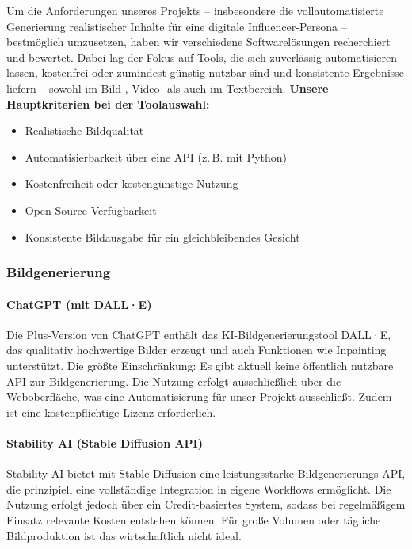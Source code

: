 \documentclass[a4paper,12pt]{article}
\begin{document}
Um die Anforderungen unseres Projekts – insbesondere die vollautomatisierte Generierung realistischer Inhalte für eine digitale Influencer-Persona – bestmöglich umzusetzen, haben wir verschiedene Softwarelösungen recherchiert und bewertet. Dabei lag der Fokus auf Tools, die sich zuverlässig automatisieren lassen, kostenfrei oder zumindest günstig nutzbar sind und konsistente Ergebnisse liefern – sowohl im Bild-, Video- als auch im Textbereich.
\clearpage
\textbf{Unsere Hauptkriterien bei der Toolauswahl:}
\begin{itemize}
    \item Realistische Bildqualität
    \item Automatisierbarkeit über eine API (z.\,B. mit Python)
    \item Kostenfreiheit oder kostengünstige Nutzung
    \item Open-Source-Verfügbarkeit
    \item Konsistente Bildausgabe für ein gleichbleibendes Gesicht
\end{itemize}

\subsubsection{Bildgenerierung}

\paragraph{ChatGPT (mit DALL·E)}
Die Plus-Version von ChatGPT enthält das KI-Bildgenerierungstool DALL·E, das qualitativ hochwertige Bilder erzeugt und auch Funktionen wie Inpainting unterstützt. Die größte Einschränkung: Es gibt aktuell keine öffentlich nutzbare API zur Bildgenerierung. Die Nutzung erfolgt ausschließlich über die Weboberfläche, was eine Automatisierung für unser Projekt ausschließt. Zudem ist eine kostenpflichtige Lizenz erforderlich.

\paragraph{Stability AI (Stable Diffusion API)}
Stability AI bietet mit Stable Diffusion eine leistungsstarke Bildgenerierungs-API, die prinzipiell eine vollständige Integration in eigene Workflows ermöglicht. Die Nutzung erfolgt jedoch über ein Credit-basiertes System, sodass bei regelmäßigem Einsatz relevante Kosten entstehen können. Für große Volumen oder tägliche Bildproduktion ist das wirtschaftlich nicht ideal.
\end{document}
